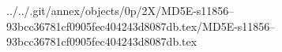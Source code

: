 ../../.git/annex/objects/0p/2X/MD5E-s11856--93bcc36781cf0905fec404243d8087db.tex/MD5E-s11856--93bcc36781cf0905fec404243d8087db.tex